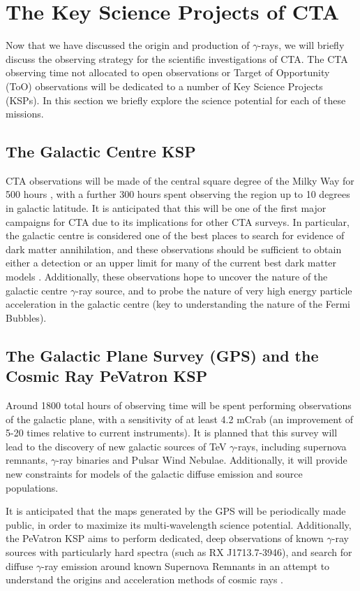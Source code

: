 \section{The Key Science Projects of CTA}
Now that we have discussed the origin and production of $\gamma$-rays, we will briefly discuss the observing strategy for the scientific investigations of CTA. The CTA observing time not allocated to open observations or Target of Opportunity (ToO) observations will be dedicated to a number of Key Science Projects (KSPs). In this section we briefly explore the science potential for each of these missions.

\subsection{The Galactic Centre KSP}
CTA observations will be made of the central square degree of the Milky Way for 500 hours \cite{scienceCTA}, with a further 300 hours spent observing the region up to 10 degrees in galactic latitude. It is anticipated that this will be one of the first major campaigns for CTA due to its implications for other CTA surveys.
In particular, the galactic centre is considered one of the best places to search for evidence of dark matter annihilation, and these observations should be sufficient to obtain either a detection or an upper limit for many of the current best dark matter models \cite{scienceCTA}. Additionally, these observations hope to uncover the nature of the galactic centre $\gamma$-ray source, and to probe the nature of very high energy particle acceleration in the galactic centre (key to understanding the nature of the Fermi Bubbles). 

\subsection{The Galactic Plane Survey (GPS) and the Cosmic Ray PeVatron KSP}
Around 1800 total hours of observing time will be spent performing observations of the galactic plane, with a sensitivity of at least 4.2 mCrab \cite{scienceCTA} (an improvement of 5-20 times relative to current instruments). It is planned that this survey will lead to the discovery of new galactic sources of TeV $\gamma$-rays, including supernova remnants, $\gamma$-ray binaries and Pulsar Wind Nebulae. Additionally, it will provide new constraints for models of the galactic diffuse emission and source populations. 

It is anticipated that the maps generated by the GPS will be periodically made public, in order to maximize its multi-wavelength science potential.
Additionally, the PeVatron KSP aims to perform dedicated, deep observations of known $\gamma$-ray sources with particularly hard spectra (such as RX J1713.7-3946), and search for diffuse $\gamma$-ray emission around known Supernova Remnants in an attempt to understand the origins and acceleration methods of cosmic rays \cite{scienceCTA}.

